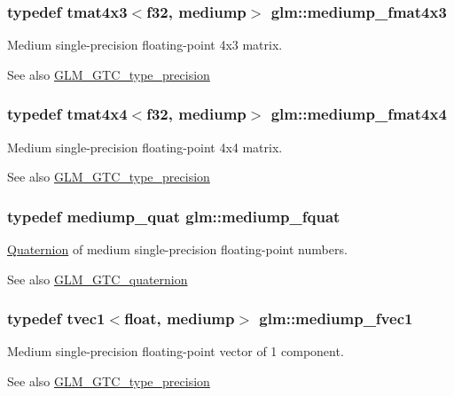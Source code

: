 \subsubsection[{mediump\+\_\+fmat4x3}]{\setlength{\rightskip}{0pt plus 5cm}typedef tmat4x3$<${\bf f32}, mediump$>$ {\bf glm\+::mediump\+\_\+fmat4x3}}\label{namespaceglm_ab86c2897e2958d40f3eac9cd5db9a172}
Medium single-\/precision floating-\/point 4x3 matrix. \begin{DoxySeeAlso}{See also}
\hyperlink{group__gtc__type__precision}{G\+L\+M\+\_\+\+G\+T\+C\+\_\+type\+\_\+precision} 
\end{DoxySeeAlso}
\hypertarget{namespaceglm_ad4ee0ec08503fbbad983bb70cb91d15e}{}
\subsubsection[{mediump\+\_\+fmat4x4}]{\setlength{\rightskip}{0pt plus 5cm}typedef tmat4x4$<${\bf f32}, mediump$>$ {\bf glm\+::mediump\+\_\+fmat4x4}}\label{namespaceglm_ad4ee0ec08503fbbad983bb70cb91d15e}
Medium single-\/precision floating-\/point 4x4 matrix. \begin{DoxySeeAlso}{See also}
\hyperlink{group__gtc__type__precision}{G\+L\+M\+\_\+\+G\+T\+C\+\_\+type\+\_\+precision} 
\end{DoxySeeAlso}
\hypertarget{namespaceglm_a154ae157e20a677e5663d97b923b1053}{}
\subsubsection[{mediump\+\_\+fquat}]{\setlength{\rightskip}{0pt plus 5cm}typedef {\bf mediump\+\_\+quat} {\bf glm\+::mediump\+\_\+fquat}}\label{namespaceglm_a154ae157e20a677e5663d97b923b1053}
\hyperlink{class_quaternion}{Quaternion} of medium single-\/precision floating-\/point numbers.

\begin{DoxySeeAlso}{See also}
\hyperlink{group__gtc__quaternion}{G\+L\+M\+\_\+\+G\+T\+C\+\_\+quaternion} 
\end{DoxySeeAlso}
\hypertarget{namespaceglm_a3fd73c0c1d435f6236f759337353a4ee}{}
\subsubsection[{mediump\+\_\+fvec1}]{\setlength{\rightskip}{0pt plus 5cm}typedef tvec1$<$float, mediump$>$ {\bf glm\+::mediump\+\_\+fvec1}}\label{namespaceglm_a3fd73c0c1d435f6236f759337353a4ee}
Medium single-\/precision floating-\/point vector of 1 component. \begin{DoxySeeAlso}{See also}
\hyperlink{group__gtc__type__precision}{G\+L\+M\+\_\+\+G\+T\+C\+\_\+type\+\_\+precision} 
\end{DoxySeeAlso}
\hypertarget{namespaceglm_aeb4a9a86b1932957717a9aa118da91dd}{}
